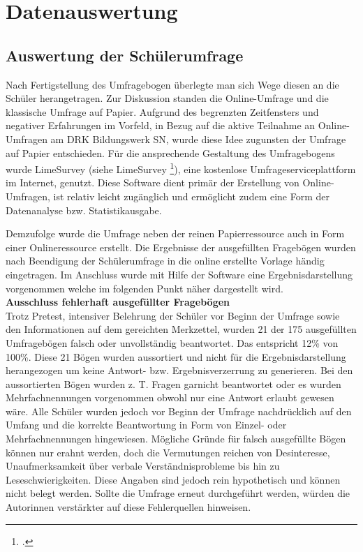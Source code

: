 \section{Datenauswertung}
\label{sec:Datenauswertung}

\subsection{Auswertung der Schülerumfrage}
\label{sec:AuswertungDerSchülerumfrage}

Nach Fertigstellung des Umfragebogen überlegte man sich Wege diesen an die Schüler herangetragen. Zur Diskussion standen die Online-Umfrage und die klassische Umfrage auf Papier. Aufgrund des begrenzten Zeitfensters und negativer Erfahrungen im Vorfeld, in Bezug auf die aktive Teilnahme an Online-Umfragen am DRK Bildungswerk SN, wurde diese Idee zugunsten der Umfrage auf Papier entschieden. Für die ansprechende Gestaltung des Umfragebogens wurde LimeSurvey (siehe LimeSurvey \footcite {LimeSurvey2015}), eine kostenlose Umfrageserviceplattform im Internet, genutzt. Diese Software dient primär der Erstellung von Online-Umfragen, ist relativ leicht zugänglich und ermöglicht zudem eine Form der Datenanalyse bzw. Statistikausgabe.

Demzufolge wurde die Umfrage neben der reinen Papierressource auch in Form einer Onlineressource erstellt. Die Ergebnisse der ausgefüllten Fragebögen wurden nach Beendigung der Schülerumfrage in die online erstellte Vorlage händig eingetragen. Im Anschluss wurde mit Hilfe der Software eine Ergebnisdarstellung vorgenommen welche im folgenden Punkt näher dargestellt wird.\\

\noindent
\textbf{Ausschluss fehlerhaft ausgefüllter Fragebögen}\\
Trotz Pretest, intensiver Belehrung der Schüler vor Beginn der Umfrage sowie den Informationen auf dem gereichten Merkzettel, wurden 21 der 175 ausgefüllten Umfragebögen falsch oder unvollständig beantwortet. Das entspricht 12\% von 100\%. Diese 21 Bögen wurden aussortiert und nicht für die Ergebnisdarstellung herangezogen um keine Antwort- bzw. Ergebnisverzerrung zu generieren. Bei den aussortierten Bögen wurden z. T. Fragen garnicht beantwortet oder es wurden Mehrfachnennungen vorgenommen obwohl nur eine Antwort erlaubt gewesen wäre. Alle Schüler wurden jedoch vor Beginn der Umfrage nachdrücklich auf den Umfang und die korrekte Beantwortung in Form von Einzel- oder Mehrfachnennungen hingewiesen. Mögliche Gründe für falsch ausgefüllte Bögen können nur erahnt werden, doch die Vermutungen reichen von Desinteresse, Unaufmerksamkeit über verbale Verständnisprobleme bis hin zu Leseschwierigkeiten. Diese Angaben sind jedoch rein hypothetisch und können nicht belegt werden. Sollte die Umfrage erneut durchgeführt werden, würden die Autorinnen verstärkter auf diese Fehlerquellen hinweisen. 

